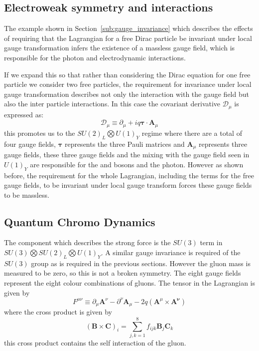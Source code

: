 \subsection{Electroweak symmetry and interactions} %
\label{sub:electro_weak_symmetry_and_interactions}
The example shown in Section~\ref{sub:gauge_invariance} which 
describes the effects of requiring that the Lagrangian for a free Dirac 
particle be invariant under local gauge transformation infers the existence of 
a massless gauge field, which is responsible for the photon and 
electrodynamic interactions.

If we expand this so that rather than considering the Dirac equation for one 
free particle we consider two free particles, the requirement for invariance 
under local gauge transformation describes not only the interaction with the gauge 
field but also the inter particle interactions. In this case the covariant 
derivative $\mathcal{D}_{\mu}$ is expressed as:
\begin{equation}
  \mathcal{D}_{\mu}\equiv \partial_{\mu} + iq \bm{\tau}\cdot\bm{A}_{\mu}
\end{equation}
this promotes us to the $SU(2)_{L} \bigotimes U(1)_{Y}$ regime where there are 
a total of four gauge fields, $\bm{\tau}$ represents the three Pauli matrices 
and $\bm{A}_{\mu}$ represents three gauge fields, these three gauge fields and 
the mixing with the gauge field seen in $U(1)_{Y}$ are responsible for the \PW 
and \PZ bosons and the photon. However as shown before, the requirement for the 
whole Lagrangian, including the terms for the free gauge fields, to be invariant under local gauge transform forces these gauge fields to be massless.


\subsection{Quantum Chromo Dynamics} %
\label{sub:quantum_chromo_dynamics}
The component which describes the strong force is the $SU(3)$ term in 
$SU(3)\bigotimes SU(2)_{L} \bigotimes U(1)_{Y}$. A similar gauge invariance is 
required of the $SU(3)$ group as is required in the previous sections. However 
the gluon mass is measured to be zero, so this is not a broken 
symmetry. The eight gauge fields represent the eight colour combinations of 
gluons. The tensor in the Lagrangian is given by
\begin{equation}
  F^{\mu\nu} \equiv \partial_{\mu}\bm{A}^{\nu} - \partial^{\nu}\bm{A}_{\mu} - 2q\left(\bm{A}^{\mu}\times\bm{A^{\nu}}\right)
  \label{eq:f_munu}
\end{equation}
where the cross product is given by
\begin{equation}
  \left(\bm{B}\times\bm{C}\right)_{i} = \sum^{8}_{j,k=1}f_{ijk}\bm{B}_{j}\bm{C}_{k}
\end{equation}
this cross product contains the self interaction of the gluon.





